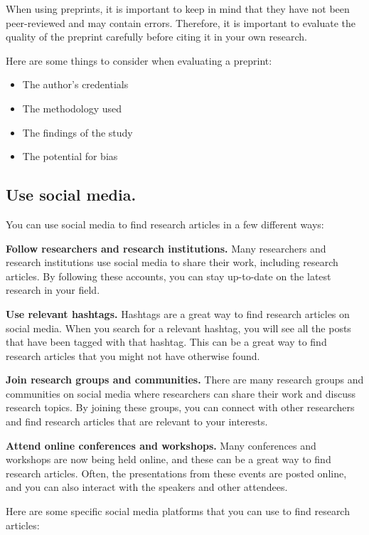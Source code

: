 \documentclass[
]{book}
\begin{document}
When using preprints, it is important to keep in mind that they have not been peer-reviewed and may contain errors. Therefore, it is important to evaluate the quality of the preprint carefully before citing it in your own research.

Here are some things to consider when evaluating a preprint:

\begin{itemize}
\item
  The author's credentials
\item
  The methodology used
\item
  The findings of the study
\item
  The potential for bias
\end{itemize}

\hypertarget{use-social-media.}{%
\subsection*{Use social media.}\label{use-social-media.}}

You can use social media to find research articles in a few different ways:

\textbf{Follow researchers and research institutions.} Many researchers and research institutions use social media to share their work, including research articles. By following these accounts, you can stay up-to-date on the latest research in your field.

\textbf{Use relevant hashtags.} Hashtags are a great way to find research articles on social media. When you search for a relevant hashtag, you will see all the posts that have been tagged with that hashtag. This can be a great way to find research articles that you might not have otherwise found.

\textbf{Join research groups and communities.} There are many research groups and communities on social media where researchers can share their work and discuss research topics. By joining these groups, you can connect with other researchers and find research articles that are relevant to your interests.

\textbf{Attend online conferences and workshops.} Many conferences and workshops are now being held online, and these can be a great way to find research articles. Often, the presentations from these events are posted online, and you can also interact with the speakers and other attendees.

Here are some specific social media platforms that you can use to find research articles:
\end{document}
